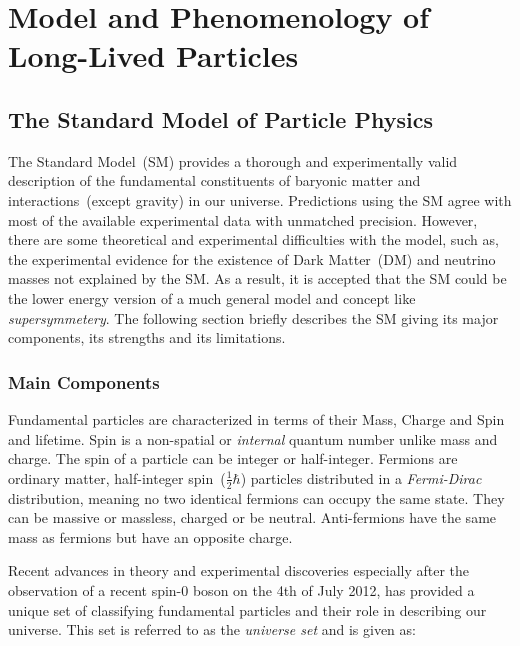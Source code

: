 
\chapter{Model and Phenomenology of Long-Lived Particles}
\label{Long_Lived_Particle_physics_chapter}


\section{The Standard Model of Particle Physics}
The Standard Model~(SM) provides a thorough and experimentally valid description of the fundamental constituents of baryonic matter and interactions~(except gravity) in our universe. Predictions using the SM agree with most of the available experimental data with unmatched precision.
However, there are some theoretical and experimental difficulties with the model, such as, the experimental evidence for the existence of Dark Matter~(DM) and neutrino masses not explained by the SM.  As a result, it is accepted that the SM could be the lower energy version of a much general model and concept like \textit{supersymmetery}.
The following section briefly describes the SM giving its major  components, its strengths and its limitations.
\subsection{Main Components}
Fundamental particles are characterized in terms of their Mass, Charge and Spin and lifetime. Spin is a non-spatial or \textit{internal} quantum number unlike mass and charge. The spin of a particle can be integer or half-integer.
Fermions are ordinary matter, half-integer spin~($\frac{1}{2} \hbar$) particles distributed in a \textit{Fermi-Dirac} distribution, meaning no two identical fermions can occupy the same state. They can be massive or massless, charged or be neutral. Anti-fermions have the same mass as fermions but have an opposite charge.

Recent advances in theory and experimental discoveries especially after the observation of a recent spin-0 boson on the 4th of July 2012, has provided a unique set of classifying fundamental particles and their role in describing our universe. This set is referred to as the \textit{universe set} and is given as:

